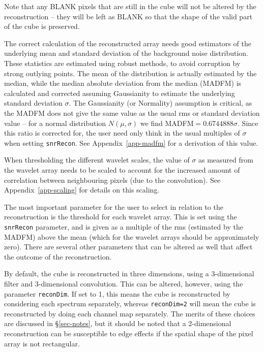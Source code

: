 Note that any BLANK pixels that are still in the cube will not be
altered by the reconstruction -- they will be left as BLANK so that
the shape of the valid part of the cube is preserved.


The correct calculation of the reconstructed array needs good
estimators of the underlying mean and standard deviation of the
background noise distribution. These statistics are estimated using
robust methods, to avoid corruption by strong outlying points. The
mean of the distribution is actually estimated by the median, while
the median absolute deviation from the median (MADFM) is calculated
and corrected assuming Gaussianity to estimate the underlying standard
deviation $\sigma$. The Gaussianity (or Normality) assumption is
critical, as the MADFM does not give the same value as the usual rms
or standard deviation value -- for a normal distribution
$N(\mu,\sigma)$ we find MADFM$=0.6744888\sigma$. Since this ratio is
corrected for, the user need only think in the usual multiples of
$\sigma$ when setting \texttt{snrRecon}. See Appendix~\ref{app-madfm}
for a derivation of this value.

When thresholding the different wavelet scales, the value of $\sigma$
as measured from the wavelet array needs to be scaled to account for
the increased amount of correlation between neighbouring pixels (due
to the convolution). See Appendix~\ref{app-scaling} for details on
this scaling.


The most important parameter for the user to select in relation to the
reconstruction is the threshold for each wavelet array. This is set
using the \texttt{snrRecon} parameter, and is given as a multiple of
the rms (estimated by the MADFM) above the mean (which for the wavelet
arrays should be approximately zero). There are several other
parameters that can be altered as well that affect the outcome of the
reconstruction.

By default, the cube is reconstructed in three dimensions, using a
3-dimensional filter and 3-dimensional convolution. This can be
altered, however, using the parameter \texttt{reconDim}. If set to 1,
this means the cube is reconstructed by considering each spectrum
separately, whereas \texttt{reconDim=2} will mean the cube is
reconstructed by doing each channel map separately. The merits of
these choices are discussed in \S\ref{sec-notes}, but it should be
noted that a 2-dimensional reconstruction can be susceptible to edge
effects if the spatial shape of the pixel array is not rectangular.

